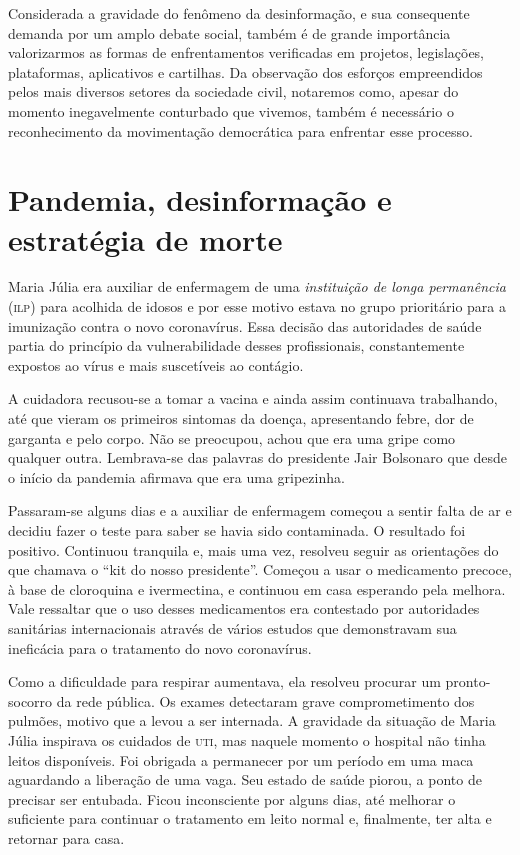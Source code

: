 Considerada a gravidade do fenômeno da desinformação,
e sua consequente demanda por um amplo debate social, também é de grande importância 
valorizarmos as formas de enfrentamentos verificadas em projetos, legislações,
plataformas, aplicativos e cartilhas. Da observação dos esforços
empreendidos pelos mais diversos setores da sociedade civil, notaremos
como, apesar do momento inegavelmente conturbado que vivemos, também é
necessário o reconhecimento da movimentação democrática para enfrentar esse
processo.


\chapter{Pandemia, desinformação e\\estratégia de morte}

Maria Júlia era auxiliar de enfermagem de uma \textit{instituição de longa
permanência} (\textsc{ilp}) para acolhida de idosos e por esse motivo estava no
grupo prioritário para a imunização contra o novo coronavírus. Essa
decisão das autoridades de saúde partia do princípio da vulnerabilidade
desses profissionais, constantemente expostos ao vírus e mais
suscetíveis ao contágio.

A cuidadora recusou-se a tomar a vacina e ainda assim continuava
trabalhando, até que vieram os primeiros sintomas da doença,
apresentando febre, dor de garganta e pelo corpo. Não se preocupou,
achou que era uma gripe como qualquer outra. Lembrava-se das palavras do
presidente Jair Bolsonaro que desde o início da pandemia afirmava que
era uma gripezinha.

Passaram-se alguns dias e a auxiliar de enfermagem começou a sentir
falta de ar e decidiu fazer o teste para saber se havia sido
contaminada. O resultado foi positivo. Continuou tranquila e, mais uma
vez, resolveu seguir as orientações do que chamava o ``kit do nosso
presidente''. Começou a usar o medicamento precoce, à base de cloroquina
e ivermectina, e continuou em casa esperando pela melhora. Vale
ressaltar que o uso desses medicamentos era contestado por autoridades
sanitárias internacionais através de vários estudos que demonstravam sua
ineficácia para o tratamento do novo coronavírus.

Como a dificuldade para respirar aumentava, ela resolveu procurar um
pronto-socorro da rede pública. Os exames detectaram grave
comprometimento dos pulmões, motivo que a levou a ser internada. A
gravidade da situação de Maria Júlia inspirava os cuidados de \textsc{uti}, mas naquele momento o hospital não tinha leitos
disponíveis. Foi obrigada a permanecer por um período em uma maca
aguardando a liberação de uma vaga. Seu estado de saúde piorou, a ponto
de precisar ser entubada. Ficou inconsciente por alguns dias, até
melhorar o suficiente para continuar o tratamento em leito normal e,
finalmente, ter alta e retornar para casa.


